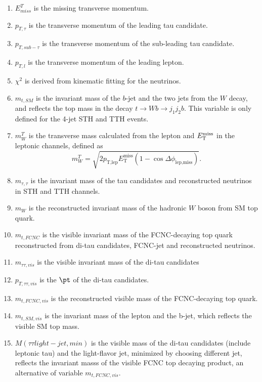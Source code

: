 \begin{enumerate}

\item $E^{T}_{miss}$ is the missing transverse momentum.
\item $p_{T,\tau}$ is the transverse momentum of the leading tau candidate.
\item $p_{T,sub-\tau}$ is the transverse momentum of the sub-leading tau candidate.
\item $p_{T,l}$ is the transverse momentum of the leading lepton.
\item $\chi^2$ is derived from kinematic fitting for the neutrinos.
\item $m_{t,SM}$ is the invariant mass of the $b$-jet and the two jets from the $W$ decay, and reflects the top mass in the decay $t\to Wb \to j_1j_2b$. This variable is only defined for the 4-jet STH and TTH events.
\item $m^{T}_{W}$ is the transverse mass calculated from the lepton and $E_{\text{T}}^{\text{miss}}$ in the leptonic channels, defined as
\begin{equation}
m^{T}_{W} = \sqrt{2 p_{\text{T,lep}} E_{\text{T}}^{\text{miss}} \left(1-\cos\Delta\phi_{\text{lep,miss}} \right)}.  
\end{equation}
\item $m_{\tau,\tau}$ is the invariant mass of the tau candidates and reconstructed neutrinos in STH and TTH channels. 
\item $m_{W}$ is the reconstructed invariant mass of the hadronic $W$ boson from SM top quark.
\item $m_{t,FCNC}$ is the visible invariant mass of the FCNC-decaying top quark reconstructed from di-tau candidates, FCNC-jet and reconstructed neutrinos.
\item $m_{\tau\tau,vis}$ is the visible invariant mass of the di-tau candidates
\item $p_{T,\tau\tau,vis}$ is the $\pt$ of the di-tau candidates.
\item $m_{t,FCNC,vis}$ is the reconstructed visible mass of the FCNC-decaying top quark.
\item $m_{t,SM,vis}$ is the invariant mass of the lepton and the b-jet, which reflects the visible SM top mass.
\item $M(\tau\tau light-jet,min)$ is the visible mass of the di-tau candidates (include leptonic tau) and the light-flavor jet, minimized by choosing different jet, reflects the invariant masss of the visible FCNC top decaying product, an alternative of variable $m_{t,FCNC,vis}$.

\end{enumerate}
